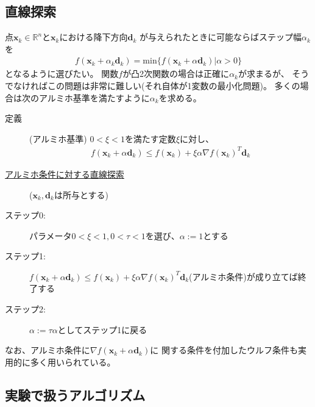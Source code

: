 \documentclass[12pt]{jarticle}
\begin{document}
\subsection{直線探索}
点$\boldsymbol{x}_k\in \mathbb{R}^n$と$\boldsymbol{x}_k$における降下方向$\boldsymbol{d}_k$
が与えられたときに可能ならばステップ幅$\alpha _k$を
\begin{eqnarray}
    f(\boldsymbol{x}_k+\alpha_k \boldsymbol{d}_k)=\text{min}\{f(\boldsymbol{x}_k+\alpha \boldsymbol{d}_k)|\alpha > 0\}\nonumber
\end{eqnarray}
となるように選びたい。
関数$f$が凸2次関数の場合は正確に$\alpha_k$が求まるが、
そうでなければこの問題は非常に難しい(それ自体が1変数の最小化問題)。
多くの場合は次のアルミホ基準を満たすように$\alpha_k$を求める。
\clearpage
\begin{description}
    \item[定義](アルミホ基準) $0<\xi <1$を満たす定数$\xi$に対し、
          \begin{eqnarray}
              f(\boldsymbol{x}_k+\alpha\boldsymbol{d}_k) \leq f(\boldsymbol{x}_k)+\xi \alpha \nabla f(\boldsymbol{x}_k)^T \boldsymbol{d}_k \nonumber
          \end{eqnarray}
    \item[\underline{アルミホ条件に対する直線探索}]($\boldsymbol{x}_k,\boldsymbol{d}_k$は所与とする)
    \item[ステップ0:]パラメータ$0<\xi <1,0<\tau <1$を選び、$\alpha := 1$とする
    \item[ステップ1:]$f(\boldsymbol{x}_k+\alpha \boldsymbol{d}_k) \leq f(\boldsymbol{x}_k)+\xi \alpha \nabla f(\boldsymbol{x}_k)^T \boldsymbol{d}_k$(アルミホ条件)が成り立てば終了する
    \item[ステップ2:]$\alpha := \tau \alpha$としてステップ1に戻る
\end{description}
なお、アルミホ条件に$\nabla f(\boldsymbol{x}_k+\alpha \boldsymbol{d}_k)$に
関する条件を付加したウルフ条件も実用的に多く用いられている。

\subsection{実験で扱うアルゴリズム}
\end{document}
